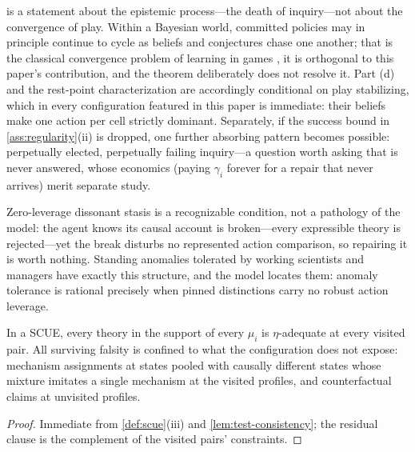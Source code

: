 \begin{remark}
\label{rem:scope}
 is a statement about the epistemic process---the death
of inquiry---not about the convergence of play.  Within a Bayesian world,
committed policies may in principle continue to cycle as beliefs and
conjectures chase one another; that is the classical convergence problem of
learning in games \citep{FudenbergLevine1993,KalaiLehrer1993a}, it is
orthogonal to this paper's contribution, and the theorem deliberately does
not resolve it.  Part (d) and the rest-point characterization are
accordingly conditional on play stabilizing, which in every configuration
featured in this paper is immediate: their beliefs make one action per cell
strictly dominant.  Separately, if the success bound in
\cref{ass:regularity}(ii) is dropped, one further absorbing pattern becomes
possible: perpetually elected, perpetually failing inquiry---a question
worth asking that is never answered, whose economics (paying $\gamma_i$
forever for a repair that never arrives) merit separate study.
\end{remark}

\begin{remark}
\label{rem:anomaly}
Zero-leverage dissonant stasis is a recognizable condition, not a
pathology of the model: the agent knows its causal account is
broken---every expressible theory is rejected---yet the break disturbs no
represented action comparison, so repairing it is worth nothing.  Standing
anomalies tolerated by working scientists and managers have exactly this
structure, and the model locates them: anomaly tolerance is rational
precisely when pinned distinctions carry no robust action leverage.
\end{remark}

\begin{proposition}
\label{prop:adequacy}
In a SCUE, every theory in the support of every $\mu_i$ is $\eta$-adequate
at every visited pair.  All surviving falsity is confined to what the
configuration does not expose: mechanism assignments at states pooled with
causally different states whose mixture imitates a single mechanism at the
visited profiles, and counterfactual claims at unvisited profiles.
\end{proposition}

\begin{proof}
Immediate from \cref{def:scue}(iii) and \cref{lem:test-consistency}; the
residual clause is the complement of the visited pairs' constraints.
\end{proof}

